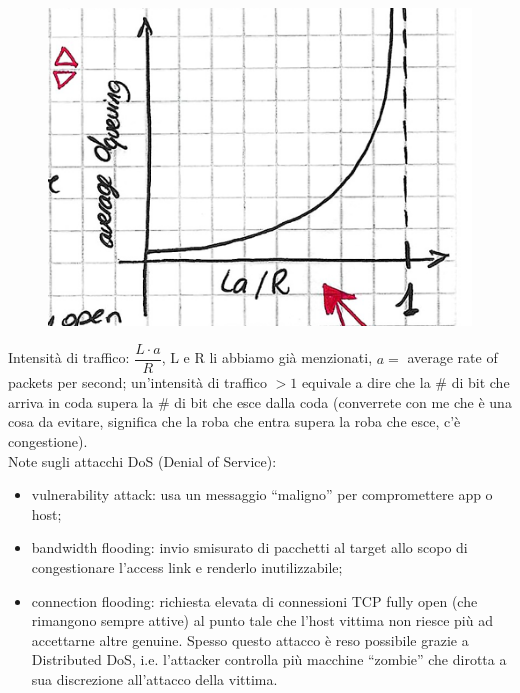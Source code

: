\begin{figure}
 \begin{center}
 \includegraphics[width=1\linewidth]{Figures/01/laR.png}
  \end{center}
\end{figure}
\noindent Intensità di traffico: $\dfrac{L\cdot a}{R}$, L e R li abbiamo già menzionati, $a=$ average rate of packets per second; un'intensità di traffico $>1$ equivale a dire che la $\#$ di bit che arriva in coda supera la $\#$ di bit che esce dalla coda (converrete con me che è una cosa da evitare, significa che la roba che entra supera la roba che esce, c'è congestione).\\

\noindent Note sugli attacchi DoS (Denial of Service):
\begin{itemize}
    \item vulnerability attack: usa un messaggio ``maligno'' per compromettere app o host;
\end{itemize}

\begin{itemize}
    \item bandwidth flooding: invio smisurato di pacchetti al target allo scopo di congestionare l'access link e renderlo inutilizzabile;
    \item {}connection flooding: richiesta elevata di connessioni TCP fully open (che rimangono sempre attive) al punto tale che l'host vittima non riesce più ad accettarne altre genuine. Spesso questo attacco è reso possibile grazie a Distributed DoS, i.e. l'attacker controlla più macchine ``zombie''  che dirotta a sua discrezione all'attacco della vittima.
\end{itemize}

